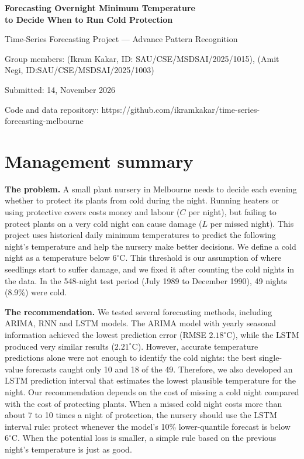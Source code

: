 \documentclass[11pt,a4paper]{article}
\newcommand{\GroupMembers}{Group members: (Ikram Kakar, ID: SAU/CSE/MSDSAI/2025/1015), (Amit Negi, ID:SAU/CSE/MSDSAI/2025/1003)}
\newcommand{\SubmitDate}{14, November 2026}
\newcommand{\GitHub}{https://github.com/ikramkakar/time-series-forecasting-melbourne}
\begin{document}
\begin{titlepage}
\centering
\vspace*{4cm}
{\LARGE\bfseries Forecasting Overnight Minimum Temperature\\[4pt] to Decide When to Run Cold Protection\par}
\vspace{1.2cm}
{\large Time-Series Forecasting Project --- Advance Pattern Recognition\par}
\vspace{2.2cm}
{\large \GroupMembers\par}
\vspace{4pt}
{\large Submitted: \SubmitDate\par}
\vspace{1cm}
{\large Code and data repository: \GitHub\par}
\end{titlepage}

\section*{Management summary}
\small
\textbf{The problem.} A small plant nursery in Melbourne needs to decide each evening whether to protect its plants from cold during the night. Running heaters or using protective covers costs money and labour ($C$ per night), but failing to protect plants on a very cold night can cause damage ($L$ per missed night). This project uses historical daily minimum temperatures to predict the following night's temperature and help the nursery make better decisions. We define a cold night as a temperature below $6^\circ$C. This threshold is our assumption of where seedlings start to suffer damage, and we fixed it after counting the cold nights in the data. In the 548-night test period (July 1989 to December 1990), 49 nights (8.9\%) were cold.

\textbf{The recommendation.} We tested several forecasting methods, including ARIMA, RNN and LSTM models. The ARIMA model with yearly seasonal information achieved the lowest prediction error (RMSE $2.18^\circ$C), while the LSTM produced very similar results ($2.21^\circ$C). However, accurate temperature predictions alone were not enough to identify the cold nights: the best single-value forecasts caught only 10 and 18 of the 49. Therefore, we also developed an LSTM prediction interval that estimates the lowest plausible temperature for the night. Our recommendation depends on the cost of missing a cold night compared with the cost of protecting plants. When a missed cold night costs more than about 7 to 10 times a night of protection, the nursery should use the LSTM interval rule: protect whenever the model's 10\% lower-quantile forecast is below $6^\circ$C. When the potential loss is smaller, a simple rule based on the previous night's temperature is just as good.
\end{document}
